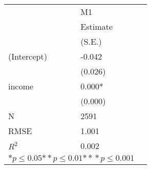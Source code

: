 \begin{tabular}{@{}l*{2}{l}@{}}
\hline
  &\multicolumn{1}{l}{M1  }\tabularnewline
 &\multicolumn{1}{l}{Estimate}\tabularnewline
 &\multicolumn{1}{l}{(S.E.)}\tabularnewline
 \hline
 \hline
  (Intercept) & -0.042 \tabularnewline
 &(0.026)\tabularnewline
  income & 0.000* \tabularnewline
 &(0.000)\tabularnewline
 \hline
 N&\multicolumn{1}{l}{2591} \tabularnewline
 RMSE&1.001\tabularnewline
 $R^2$&0.002\tabularnewline
 \hline
\hline
 
 \multicolumn{2}{l}{  ${*  p}\le 0.05$${*\!\!*  p}\le 0.01$${*\!\!*\!\!*  p}\le 0.001$}\tabularnewline
 \end{tabular}